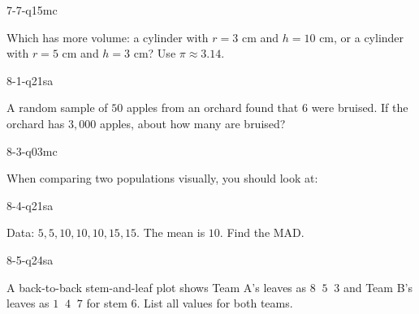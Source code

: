 \begin{practiceQuestion}{7-7-q15}{mc}
\begin{questionText}
Which has more volume: a cylinder with $r = 3$ cm and $h = 10$ cm, or a cylinder with $r = 5$ cm and $h = 3$ cm? Use $\pi \approx 3.14$.
\end{questionText}
\end{practiceQuestion}

\begin{practiceQuestion}{8-1-q21}{sa}
\begin{questionText}
A random sample of $50$ apples from an orchard found that $6$ were bruised. If the orchard has $3{,}000$ apples, about how many are bruised?
\end{questionText}
\end{practiceQuestion}

\begin{practiceQuestion}{8-3-q03}{mc}
\begin{questionText}
When comparing two populations visually, you should look at:
\end{questionText}
\end{practiceQuestion}

\begin{practiceQuestion}{8-4-q21}{sa}
\begin{questionText}
Data: $5, 5, 10, 10, 10, 15, 15$. The mean is $10$. Find the MAD.
\end{questionText}
\end{practiceQuestion}

\begin{practiceQuestion}{8-5-q24}{sa}
\begin{questionText}
A back-to-back stem-and-leaf plot shows Team A's leaves as $8\;\;5\;\;3$ and Team B's leaves as $1\;\;4\;\;7$ for stem $6$. List all values for both teams.
\end{questionText}
\end{practiceQuestion}

